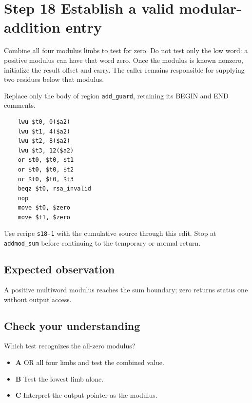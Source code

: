 \section{Step 18 Establish a valid modular-addition entry}\label{rsa-s18}

Combine all four modulus limbs to test for zero. Do not test only the low word: a positive modulus can have that word zero. Once the modulus is known nonzero, initialize the result offset and carry. The caller remains responsible for supplying two residues below that modulus.

Replace only the body of region \texttt{add\_guard}, retaining its BEGIN and END comments.

\begin{verbatim}
    lwu $t0, 0($a2)
    lwu $t1, 4($a2)
    lwu $t2, 8($a2)
    lwu $t3, 12($a2)
    or $t0, $t0, $t1
    or $t0, $t0, $t2
    or $t0, $t0, $t3
    beqz $t0, rsa_invalid
    nop
    move $t0, $zero
    move $t1, $zero
\end{verbatim}

Use recipe \texttt{s18-1} with the cumulative source through this edit. Stop at \texttt{addmod\_sum} before continuing to the temporary or normal return.

\subsection{Expected observation}
A positive multiword modulus reaches the sum boundary; zero returns status one without output access.

\subsection{Check your understanding}
Which test recognizes the all-zero modulus?

\begin{itemize}
  \item \textbf{A} OR all four limbs and test the combined value.
  \item \textbf{B} Test the lowest limb alone.
  \item \textbf{C} Interpret the output pointer as the modulus.
\end{itemize}
